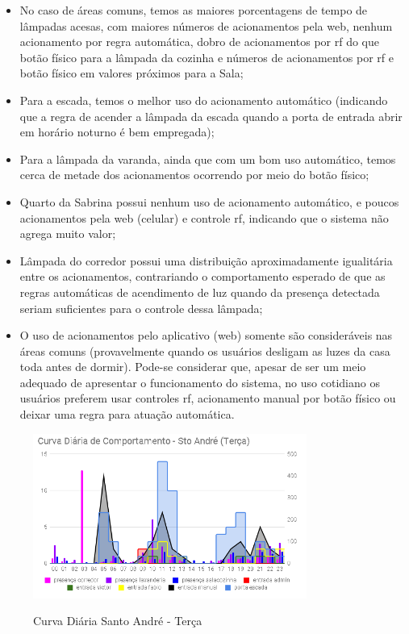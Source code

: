 \begin{itemize}
	\item No caso de áreas comuns, temos as maiores porcentagens de tempo de lâmpadas acesas, com maiores números de acionamentos pela web, nenhum acionamento por regra automática, dobro de acionamentos por rf do que botão físico para a lâmpada da cozinha e números de acionamentos por rf e botão físico em valores próximos para a Sala;
	\item Para a escada, temos o melhor uso do acionamento automático (indicando que a regra de acender a lâmpada da escada quando a porta de entrada abrir em horário noturno é bem empregada);
	\item Para a lâmpada da varanda, ainda que com um bom uso automático, temos cerca de metade dos acionamentos ocorrendo por meio do botão físico;
	\item Quarto da Sabrina possui nenhum uso de acionamento automático, e poucos acionamentos pela web (celular) e controle rf, indicando que o sistema não agrega muito valor;
	\item Lâmpada do corredor possui uma distribuição aproximadamente igualitária entre os acionamentos, contrariando o comportamento esperado de que as regras automáticas de acendimento de luz quando da presença detectada seriam suficientes para o controle dessa lâmpada;
	\item O uso de acionamentos pelo aplicativo (web) somente são consideráveis nas áreas comuns (provavelmente quando os usuários desligam as luzes da casa toda antes de dormir). Pode-se considerar que, apesar de ser um meio adequado de apresentar o funcionamento do sistema, no uso cotidiano os usuários preferem usar controles rf, acionamento manual por botão físico ou deixar uma regra para atuação automática.
\end{itemize}

\begin{figure}[H]
	\centering
	\caption{Curva Diária Santo André - Terça}
	\includegraphics[width=0.8\textwidth]{diaStoAndreTerca}
	\label{fig:diaStoAndreTerca}
\end{figure}

